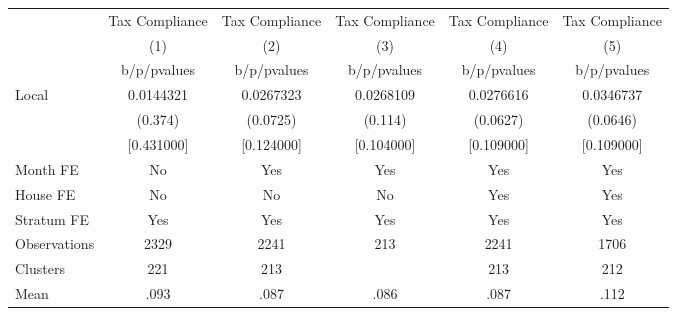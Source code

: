 {
\def\sym#1{\ifmmode^{#1}\else\(^{#1}\)\fi}
\begin{tabular}{l*{5}{c}}
\toprule
                &\multicolumn{1}{c}{Tax Compliance}&\multicolumn{1}{c}{Tax Compliance}&\multicolumn{1}{c}{Tax Compliance}&\multicolumn{1}{c}{Tax Compliance}&\multicolumn{1}{c}{Tax Compliance}\\
                &\multicolumn{1}{c}{(1)}&\multicolumn{1}{c}{(2)}&\multicolumn{1}{c}{(3)}&\multicolumn{1}{c}{(4)}&\multicolumn{1}{c}{(5)}\\
                &b/p/pvalues&b/p/pvalues&b/p/pvalues&b/p/pvalues&b/p/pvalues\\
\midrule
Local           &0.0144321&0.0267323&0.0268109&0.0276616&0.0346737\\
                &  (0.374)& (0.0725)&  (0.114)& (0.0627)& (0.0646)\\
                &[0.431000]&[0.124000]&[0.104000]&[0.109000]&[0.109000]\\
Month FE        &       No&      Yes&      Yes&      Yes&      Yes\\
House FE        &       No&       No&       No&      Yes&      Yes\\
Stratum FE      &      Yes&      Yes&      Yes&      Yes&      Yes\\
\midrule
Observations    &     2329&     2241&      213&     2241&     1706\\
Clusters        &      221&      213&         &      213&      212\\
Mean            &     .093&     .087&     .086&     .087&     .112\\
\bottomrule
\end{tabular}
}
